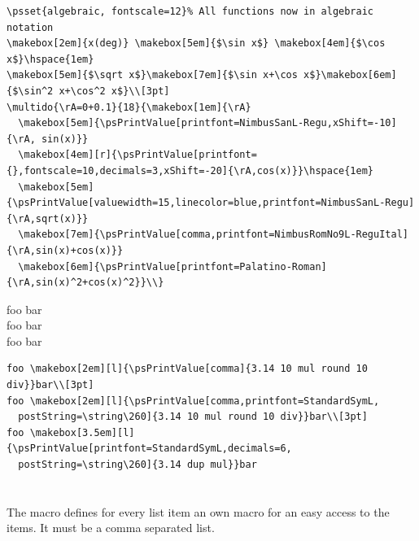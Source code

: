 \documentclass[fontsize=11pt,english,BCOR=10mm,DIV=12,bibliography=totoc,parskip=false,headings=small,
    headinclude=false,footinclude=false,oneside]{pst-doc}
\begin{document}
\bigskip

\begin{lstlisting}
\psset{algebraic, fontscale=12}% All functions now in algebraic notation
\makebox[2em]{x(deg)} \makebox[5em]{$\sin x$} \makebox[4em]{$\cos x$}\hspace{1em}
\makebox[5em]{$\sqrt x$}\makebox[7em]{$\sin x+\cos x$}\makebox[6em]{$\sin^2 x+\cos^2 x$}\\[3pt]
\multido{\rA=0+0.1}{18}{\makebox[1em]{\rA}
  \makebox[5em]{\psPrintValue[printfont=NimbusSanL-Regu,xShift=-10]{\rA, sin(x)}}
  \makebox[4em][r]{\psPrintValue[printfont={},fontscale=10,decimals=3,xShift=-20]{\rA,cos(x)}}\hspace{1em}
  \makebox[5em]{\psPrintValue[valuewidth=15,linecolor=blue,printfont=NimbusSanL-Regu]{\rA,sqrt(x)}}
  \makebox[7em]{\psPrintValue[comma,printfont=NimbusRomNo9L-ReguItal]{\rA,sin(x)+cos(x)}}
  \makebox[6em]{\psPrintValue[printfont=Palatino-Roman]{\rA,sin(x)^2+cos(x)^2}}\\}
\end{lstlisting}



\begin{center}
foo bar\\[3pt]
foo bar\\[3pt]
foo bar
\end{center}

\bigskip

\begin{lstlisting}
foo \makebox[2em][l]{\psPrintValue[comma]{3.14 10 mul round 10 div}}bar\\[3pt]
foo \makebox[2em][l]{\psPrintValue[comma,printfont=StandardSymL,
  postString=\string\260]{3.14 10 mul round 10 div}}bar\\[3pt]
foo \makebox[3.5em][l]{\psPrintValue[printfont=StandardSymL,decimals=6,
  postString=\string\260]{3.14 dup mul}}bar
\end{lstlisting}


\clearpage

\section{}\label{sec:getElement}
The macro defines for every list item an own macro for an easy access to the items. 
It must be a comma separated list.
\end{document}
